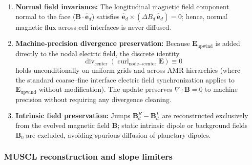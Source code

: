 \documentclass[a4paper, 11pt]{article}
\begin{document}
\begin{enumerate}
  \item \textbf{Normal field invariance:} The longitudinal magnetic field component normal to the face ($\mathbf{B} \cdot \hat{\mathbf{e}}_d$) satisfies $\hat{\mathbf{e}}_d \times (\Delta B_d\,\hat{\mathbf{e}}_d) = 0$; hence, normal magnetic flux across cell interfaces is never diffused.
  \item \textbf{Machine-precision divergence preservation:} Because $\mathbf{E}_{\text{upwind}}$ is added directly to the nodal electric field, the discrete identity
  \begin{equation}
  \operatorname{div}_{\text{center}}\left(\operatorname{curl}_{\text{node}\to\text{center}} \mathbf{E}\right) \equiv 0
  \end{equation}
  holds unconditionally on uniform grids and across AMR hierarchies (where the standard coarse--fine interface electric field synchronization applies to $\mathbf{E}_{\text{upwind}}$ without modification). The update preserves $\nabla \cdot \mathbf{B} = 0$ to machine precision without requiring any divergence cleaning.
  \item \textbf{Intrinsic field preservation:} Jumps $\mathbf{B}^R_d - \mathbf{B}^L_d$ are reconstructed exclusively from the evolved magnetic field $\mathbf{B}$; static intrinsic dipole or background fields $\mathbf{B}_0$ are excluded, avoiding spurious diffusion of planetary dipoles.
\end{enumerate}

\subsubsection{MUSCL reconstruction and slope limiters}
\end{document}
